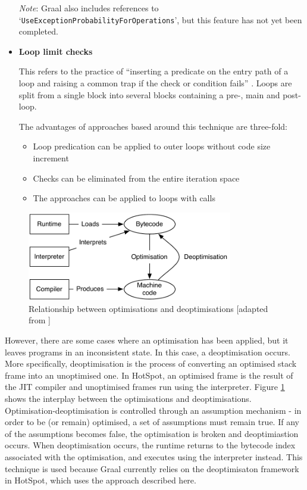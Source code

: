 \begin{itemize}
		{\small\textit{Note}: Graal also includes references to `\texttt{UseExceptionProbabilityForOperations}', but this feature has not yet been completed.}
	
	\item \textbf{Loop limit checks}
	
		This refers to the practice of ``inserting a predicate on the entry path of a loop and raising a common trap if the check or condition fails'' \citep{LoopPrediction}. Loops are split from a single block into several blocks containing a pre-, main and post- loop.
		
		The advantages of approaches based around this technique are three-fold:
		
		\begin{itemize}
			\item Loop predication can be applied to outer loops without code size increment
			
			\item Checks can be eliminated from the entire iteration space
			
			\item The approaches can be applied to loops with calls
		\end{itemize}
\end{itemize}

\begin{figure}
	\centering
	\includegraphics[width=0.8\textwidth]{graphics/jvminternals.pdf}
	\caption{Relationship between optimisations and deoptimisations [adapted from \citealp[p.~24]{Schwaighofer2009}]}
	\label{fig:jvm-internals}
\end{figure}

However, there are some cases where an optimisation has been applied, but it leaves programs in an inconsistent state. In this case, a deoptimisation occurs. More specifically, deoptimisation \citep{Holzle1992} is the process of converting an optimised stack frame into an unoptimised one. In HotSpot, an optimised frame is the result of the JIT compiler and unoptimised frames run using the interpreter. Figure \ref{fig:jvm-internals} shows the interplay between the optimisations and deoptimisations. Optimisation-deoptimisation is controlled through an assumption mechanism - in order to be (or remain) optimised, a set of assumptions must remain true. If any of the assumptions becomes false, the optimisation is broken and deoptimiastion occurs. When deoptimisation occurs, the runtime returns to the bytecode index associated with the optimisation, and executes using the interpreter instead. This technique is used because Graal currently relies on the deoptimisaton framework in HotSpot\texttrademark, which uses the approach described here. 

